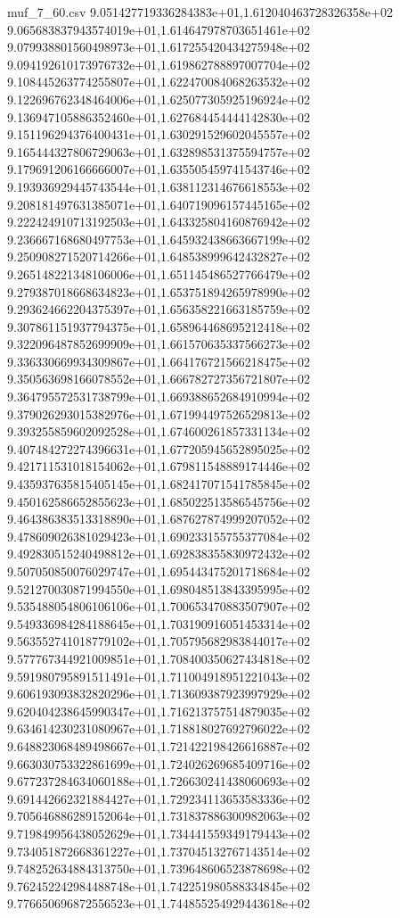 \begin{filecontents*}{muf_7_60.csv}
9.051427719336284383e+01,1.612040463728326358e+02
9.065683837943574019e+01,1.614647978703651461e+02
9.079938801560498973e+01,1.617255420434275948e+02
9.094192610173976732e+01,1.619862788897007704e+02
9.108445263774255807e+01,1.622470084068263532e+02
9.122696762348464006e+01,1.625077305925196924e+02
9.136947105886352460e+01,1.627684454444142830e+02
9.151196294376400431e+01,1.630291529602045557e+02
9.165444327806729063e+01,1.632898531375594757e+02
9.179691206166666007e+01,1.635505459741543746e+02
9.193936929445743544e+01,1.638112314676618553e+02
9.208181497631385071e+01,1.640719096157445165e+02
9.222424910713192503e+01,1.643325804160876942e+02
9.236667168680497753e+01,1.645932438663667199e+02
9.250908271520714266e+01,1.648538999642432827e+02
9.265148221348106006e+01,1.651145486527766479e+02
9.279387018668634823e+01,1.653751894265978990e+02
9.293624662204375397e+01,1.656358221663185759e+02
9.307861151937794375e+01,1.658964468695212418e+02
9.322096487852699909e+01,1.661570635337566273e+02
9.336330669934309867e+01,1.664176721566218475e+02
9.350563698166078552e+01,1.666782727356721807e+02
9.364795572531738799e+01,1.669388652684910994e+02
9.379026293015382976e+01,1.671994497526529813e+02
9.393255859602092528e+01,1.674600261857331134e+02
9.407484272274396631e+01,1.677205945652895025e+02
9.421711531018154062e+01,1.679811548889174446e+02
9.435937635815405145e+01,1.682417071541785845e+02
9.450162586652855623e+01,1.685022513586545756e+02
9.464386383513318890e+01,1.687627874999207052e+02
9.478609026381029423e+01,1.690233155755377084e+02
9.492830515240498812e+01,1.692838355830972432e+02
9.507050850076029747e+01,1.695443475201718684e+02
9.521270030871994550e+01,1.698048513843395995e+02
9.535488054806106106e+01,1.700653470883507907e+02
9.549336984284188645e+01,1.703190916051453314e+02
9.563552741018779102e+01,1.705795682983844017e+02
9.577767344921009851e+01,1.708400350627434818e+02
9.591980795891511491e+01,1.711004918951221043e+02
9.606193093832820296e+01,1.713609387923997929e+02
9.620404238645990347e+01,1.716213757514879035e+02
9.634614230231080967e+01,1.718818027692796022e+02
9.648823068489498667e+01,1.721422198426616887e+02
9.663030753322861699e+01,1.724026269685409716e+02
9.677237284634060188e+01,1.726630241438060693e+02
9.691442662321884427e+01,1.729234113653583336e+02
9.705646886289152064e+01,1.731837886300982063e+02
9.719849956438052629e+01,1.734441559349179443e+02
9.734051872668361227e+01,1.737045132767143514e+02
9.748252634884313750e+01,1.739648606523878698e+02
9.762452242984488748e+01,1.742251980588334845e+02
9.776650696872556523e+01,1.744855254929443618e+02

\end{filecontents*}
